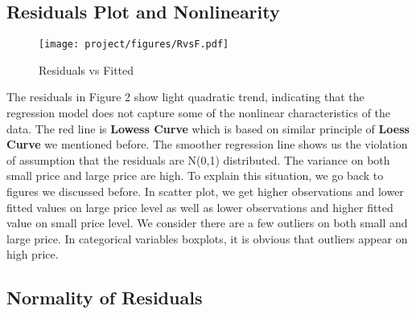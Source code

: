 \documentclass[a4paper]{article}
\begin{document}
\subsection{Residuals Plot and Nonlinearity}
\begin{figure}[!htb]
    \centering
    \texttt{[image: project/figures/RvsF.pdf]}
    \caption{Residuals vs Fitted}
    \label{4}
\end{figure}


\noindent
The residuals in Figure 2 show light quadratic trend, indicating that the regression model does not capture some of the nonlinear characteristics of the data. The red line is \textbf{Lowess Curve} which is based on similar principle of \textbf{Loess Curve} we mentioned before. The smoother regression line shows us the violation of assumption that the residuals are N(0,1) distributed. The variance on both small price and large price are high. To explain this situation, we go back to figures we discussed before. In scatter plot, we get higher observations and lower fitted values on large price level as well as lower observations and higher fitted value on small price level. We consider there are a few outliers on both small and large price. In categorical variables boxplots, it is obvious that outliers appear on high price.\\





\subsection{Normality of Residuals}
\end{document}
